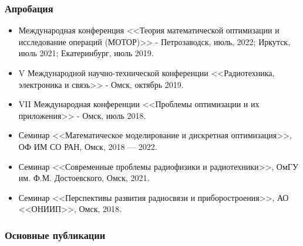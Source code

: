 \begin{frame}
    \frametitle{Апробация}
    \begin{itemize}
      \item Международная конференция <<Теория математической оптимизации и исследование операций (МОТОР)>> - Петрозаводск, июль, 2022; Иркутск, июль 2021; Екатеринбург, июль 2019.
      \item V Международной научно-технической конференции <<Радиотехника, электроника и связь>> - Омск, октябрь 2019.
      \item VII Международная конференции <<Проблемы оптимизации и их приложения>> - Омск, июль 2018.
      \item Семинар <<Математическое моделирование и дискретная оптимизация>>, ОФ ИМ СО РАН, Омск, 2018 — 2022.
      \item Семинар <<Современные проблемы радиофизики и радиотехники>>, ОмГУ им. Ф.М. Достоевского, Омск, 2021.
      \item Семинар <<Перспективы развития радиосвязи и приборостроения>>, АО <<ОНИИП>>, Омск, 2018.
    \end{itemize}
\end{frame}

 \begin{frame}[t,allowframebreaks] %
    \frametitle{Основные публикации}
    \nocite{tyu:daor}%
    \nocite{tyu:jphys}%
    \nocite{tyu:motor}%
    \nocite{tyu:msim22}%
    \nocite{tyu22:ring}%
\end{frame}

